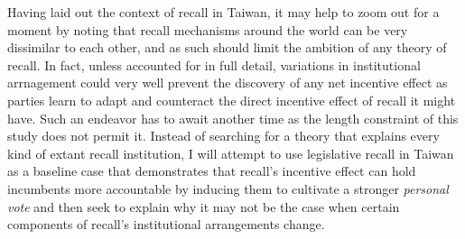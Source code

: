 \documentclass[hyphens, crop=false]{standalone}
\begin{document}
	
	
		Having laid out the context of recall in Taiwan,
		it may help to zoom out for a moment by noting that
		recall mechanisms around the world can be very dissimilar to each other,
		and as such should limit the ambition of any theory of recall.
		In fact,
		unless accounted for in full detail,
		variations in institutional arrnagement
		could very well prevent the discovery of any net incentive effect
		as parties learn to adapt and counteract the direct incentive effect of recall it might have.
		Such an endeavor has to await another time
		as the length constraint of this study does not permit it.
		Instead of searching for a theory that explains every kind of extant recall institution,
		I will attempt to use legislative recall in Taiwan as a baseline case that demonstrates
		that recall's incentive effect can hold incumbents more accountable
		by inducing them to cultivate a stronger \textit{personal vote}
		and then seek to explain why it may not be the case when
		certain components of recall's institutional arrangements change.
	
	
	
	
\end{document}
